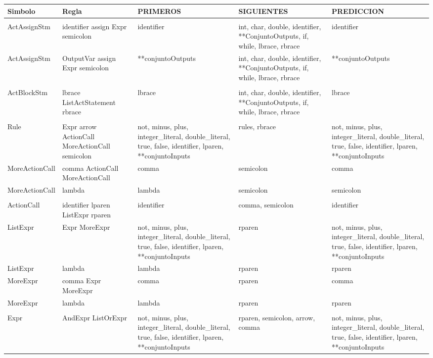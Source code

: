 \begin{tabularx}{\textwidth}{BBBBB}
          \toprule
          Simbolo & Regla & PRIMEROS & SIGUIENTES & PREDICCION \\
          \midrule
      &       &       &       &  \\
               ActAssignStm & identifier assign Expr semicolon & identifier & int, char, double, identifier, **ConjuntoOutputs, if, while, lbrace, rbrace & identifier \\
               ActAssignStm & OutputVar assign Expr semicolon & **conjuntoOutputs & int, char, double, identifier, **ConjuntoOutputs, if, while, lbrace, rbrace & **conjuntoOutputs \\
                     &       &       &       &  \\
               ActBlockStm & lbrace ListActStatement rbrace & lbrace & int, char, double, identifier, **ConjuntoOutputs, if, while, lbrace, rbrace & lbrace \\
                     &       &       &       &  \\
               Rule  & Expr arrow ActionCall MoreActionCall semicolon & not, minus, plus, integer\_literal, double\_literal, true, false, identifier, lparen, **conjuntoInputs & rules, rbrace & not, minus, plus, integer\_literal, double\_literal, true, false, identifier, lparen, **conjuntoInputs \\
               MoreActionCall & comma ActionCall MoreActionCall & comma & semicolon & comma \\
               MoreActionCall & lambda & lambda & semicolon & semicolon \\
                     &       &       &       &  \\
               ActionCall & identifier lparen ListExpr rparen & identifier & comma, semicolon & identifier \\
               ListExpr & Expr MoreExpr & not, minus, plus, integer\_literal, double\_literal, true, false, identifier, lparen, **conjuntoInputs & rparen & not, minus, plus, integer\_literal, double\_literal, true, false, identifier, lparen, **conjuntoInputs \\
               ListExpr & lambda & lambda & rparen & rparen \\
               MoreExpr & comma Expr MoreExpr & comma & rparen & comma \\
               MoreExpr & lambda & lambda & rparen & rparen \\
                     &       &       &       &  \\
               Expr  & AndExpr ListOrExpr & not, minus, plus, integer\_literal, double\_literal, true, false, identifier, lparen, **conjuntoInputs & rparen, semicolon, arrow, comma & not, minus, plus, integer\_literal, double\_literal, true, false, identifier, lparen, **conjuntoInputs \\


           \bottomrule
               \end{tabularx}%

